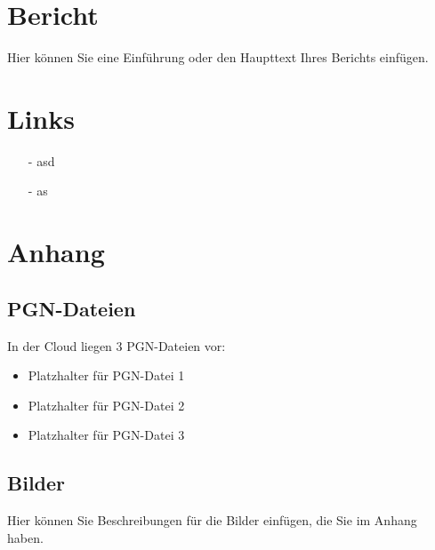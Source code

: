 \documentclass[a4paper,ngerman]{tui-algo-seminar}
\title{\inhalt}
\author{Erik Skopp}
\newcommand{\inhalt}{28. Magdeburger A-Open 2023}
\begin{document}
\maketitle
\thispagestyle{plain} %
\begin{abstract}
Bericht: \inhalt.\\
Das 
\end{abstract}

\section{Bericht}
Hier können Sie eine Einführung oder den Haupttext Ihres Berichts einfügen.

\section{Links}
\begin{itemize}
    \item[-] asd
    \item[-] as
\end{itemize}

\section{Anhang}
\subsection{PGN-Dateien}
In der Cloud liegen 3 PGN-Dateien vor:
\begin{itemize}
    \item Platzhalter für PGN-Datei 1
    \item Platzhalter für PGN-Datei 2
    \item Platzhalter für PGN-Datei 3
\end{itemize}

\subsection{Bilder}
Hier können Sie Beschreibungen für die Bilder einfügen, die Sie im Anhang haben.
\end{document}
